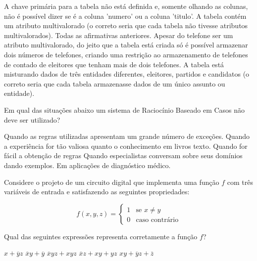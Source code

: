 \documentclass[12pt, addpoints]{exam}
\begin{document}
\begin{questions}
\begin{choices}
\choice A chave primária para a tabela não está definida e, somente olhando as colunas, não é possível dizer se é a coluna 'numero' ou a coluna 'titulo'.
\choice A tabela contém um atributo multivalorado (o correto seria que cada tabela não tivesse atributos multivalorados).
\choice Todas as afirmativas anteriores.
\choice Apesar do telefone ser um atributo multivalorado, do jeito que a tabela está criada só é possível armazenar dois números de telefones, criando uma restrição ao armazenamento de telefones de contado de eleitores que tenham mais de dois telefones.
\choice A tabela está misturando dados de três entidades diferentes, eleitores, partidos e candidatos (o correto seria que cada tabela armazenasse dados de um único assunto ou entidade).
\end{choices}

\question
Em qual das situações abaixo um sistema de Raciocínio Baseado em Casos não deve ser utilizado?

\begin{choices}
\choice Quando as regras utilizadas apresentam um grande número de exceções.
\choice Quando a experiência for tão valiosa quanto o conhecimento em livros texto.
\choice Quando for fácil a obtenção de regras
\choice Quando especialistas conversam sobre seus domínios dando exemplos.
\choice Em aplicações de diagnóstico médico.
\end{choices}

\question
Considere o projeto de um circuito digital que implementa uma função \( f \) com três variáveis de entrada e satisfazendo as seguintes propriedades:

\[
f(x, y, z) = 
\begin{cases} 
1 & \text{se } x \neq y \\ 
0 & \text{caso contrário} 
\end{cases}
\]

Qual das seguintes expressões representa corretamente a função \( f \)?
\begin{choices}
\choice \( x + \overline{y}z \)
\choice \( \overline{x}y + \overline{y} \)
\choice \( \overline{x}y z + x y z \)
\choice \( \overline{x}z + xy + yz \)
\choice \( xy + \overline{y}z + \overline{z} \)
\end{choices}



    \end{questions}
    
\end{document}

